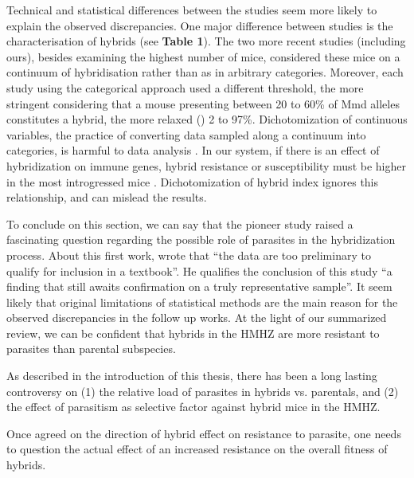 Technical and statistical differences between the studies seem more likely to explain the observed discrepancies. One major difference between studies is the characterisation of hybrids (see \textbf{Table 1}). The two more recent studies (including ours), besides examining the highest number of mice, considered these mice on a continuum of hybridisation rather than as in arbitrary categories. Moreover, each study using the categorical approach used a different threshold, the more stringent \cite{moulia_wormy_1991} considering that a mouse presenting between 20 to 60\% of Mmd alleles constitutes a hybrid, the more relaxed (\cite{moulia_experimental_1993}) 2 to 97\%. Dichotomization of continuous variables, the practice of converting data sampled along a continuum into categories, is harmful to data analysis \citep{maccallum_practice_2002}. In our system, if there is an effect of hybridization on immune genes, hybrid resistance or susceptibility must be higher in the most introgressed mice \citep{baird_where_2012}. Dichotomization of hybrid index ignores this relationship, and can mislead the results. 
\par
To conclude on this section, we can say that the pioneer study \cite{sage_wormy_1986} raised a fascinating question regarding the possible role of parasites in the hybridization process. About this first work, \cite{klein_book_1988} wrote that “the data are too preliminary to qualify for inclusion in a textbook”. He qualifies the conclusion of this study “a finding that still awaits confirmation on a truly representative sample”. It seem likely that original limitations of statistical methods are the main reason for the observed discrepancies in the follow up works. At the light of our summarized review, we can be confident that hybrids in the HMHZ are more resistant to parasites than parental subspecies.
\par
As described in the introduction of this thesis, there has been a long lasting controversy on (1) the relative load of parasites in hybrids vs. parentals, and (2) the effect of parasitism as selective factor against hybrid mice in the HMHZ.
\par
Once agreed on the direction of hybrid effect on resistance to parasite, one needs to question the actual effect of an increased resistance on the overall fitness of hybrids.

